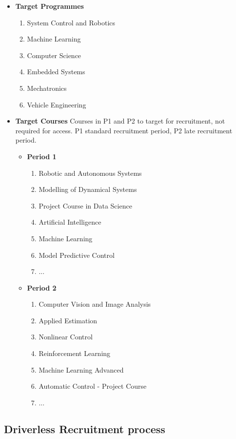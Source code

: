 \documentclass[graybox]{svmult}
\begin{document}
\begin{itemize}
  \item \textbf{Target Programmes}
  \begin{enumerate}
    \item System Control and Robotics
    \item Machine Learning
    \item Computer Science
    \item Embedded Systems
    \item Mechatronics
    \item Vehicle Engineering
  \end{enumerate}

  \item \textbf{Target Courses}
  Courses in P1 and P2 to target for recruitment, not required for access.
  P1 standard recruitment period, P2 late recruitment period.
  \begin{itemize}
    \item \textbf{Period 1}
    \begin{enumerate}
      \item Robotic and Autonomous Systems
      \item Modelling of Dynamical Systems
      \item Project Course in Data Science
      \item Artificial Intelligence
      \item Machine Learning
      \item Model Predictive Control
      \item ...
    \end{enumerate}
    \item \textbf{Period 2}
    \begin{enumerate}
      \item Computer Vision and Image Analysis
      \item Applied Estimation
      \item Nonlinear Control
      \item Reinforcement Learning
      \item Machine Learning Advanced
      \item Automatic Control - Project Course
      \item ...
    \end{enumerate}
  \end{itemize}
\end{itemize}

\subsection{Driverless Recruitment process}
\end{document}
